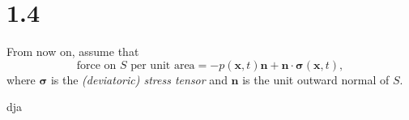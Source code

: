 \section{1.4}
\label{sec:1.4}

\begin{asm}
  \label{asm:surfaceForceViscous}
  From now on,
  assume that
  \begin{equation}
    \label{eq:surfaceForceSigma}
    \text{force on $S$ per unit area} = -p(\mathbf{x},t)\mathbf{n}+\mathbf{n}\cdot\boldsymbol\sigma(\mathbf{x},t),
  \end{equation}
  where $\boldsymbol\sigma$ is the \emph{(deviatoric) stress tensor} and
  $\mathbf{n}$ is the unit outward normal of $S$.
\end{asm}

dja
